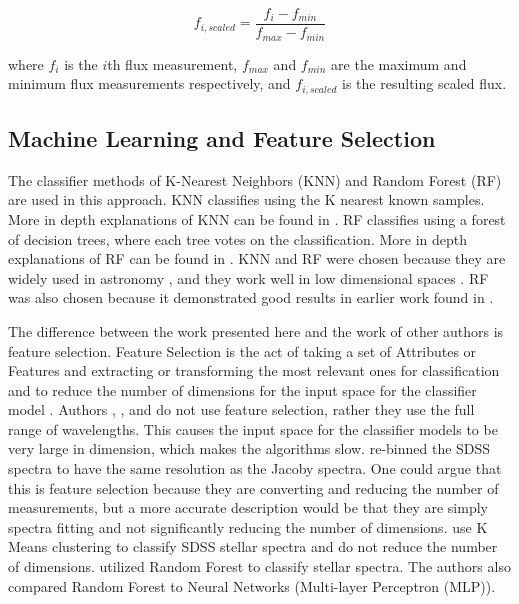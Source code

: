 \documentclass[trackchanges, floatfix, twocolumn, tighten]{aastex62}
\begin{document}
\begin{equation}\label{eq:scale}
	f_{i, scaled} = \frac{f_i - f_{min}}{f_{max} - f_{min}}
\end{equation}

where $f_i$ is the \(i\)th  flux measurement, $f_{max}$ and $f_{min}$ are the maximum and minimum flux measurements respectively, and $f_{i, scaled}$ is the resulting scaled flux.

\subsection{Machine Learning and Feature Selection}

The classifier methods of K-Nearest Neighbors (KNN) and Random Forest (RF) are used in this approach. KNN classifies using the K nearest known samples. More in depth explanations of KNN can be found in \cite{Marsland, VanderPlas, KNN}. RF classifies using a forest of decision trees, where each tree votes on the classification. More in depth explanations of RF can be found in \cite{Marsland, VanderPlas, Breiman}. KNN and RF were chosen because they are widely used in astronomy \citep{VanderPlas, Bai, YI},  and they work well in low dimensional spaces \citep{KNN, Breiman}. RF was also chosen because it demonstrated good results in earlier work found in \cite{brice}.

The difference between the work presented here and the work of other authors is feature selection. Feature Selection is the act of taking a set of Attributes or Features and extracting or transforming the most relevant ones for classification and to reduce the number of dimensions for the input space for the classifier model \citep{Canedo}. Authors \cite{Bazarghan}, \cite{Almeida}, and \cite{YI} do not use feature selection, rather they use the full range of wavelengths. This causes the input space for the classifier models to be very large in dimension, which makes the algorithms slow. \cite{Bazarghan} re-binned the SDSS spectra to have the same resolution as the Jacoby \citep{Jacoby} spectra. One could argue that this is feature selection because they are converting and reducing the number of measurements, but a more accurate description would be that they are simply spectra fitting and not significantly reducing the number of dimensions. \cite{Almeida} use K Means clustering to classify SDSS stellar spectra and do not reduce the number of dimensions. \cite{YI} utilized Random Forest to classify stellar spectra. The authors also compared Random Forest to Neural Networks (Multi-layer Perceptron (MLP)).
\end{document}
